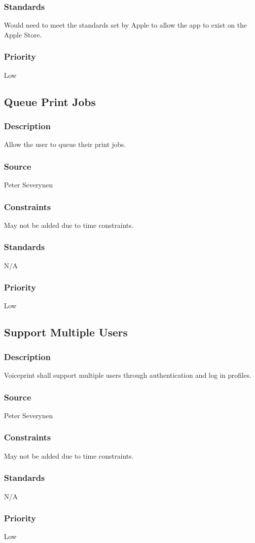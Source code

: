 \subsubsection{Standards}
Would need to meet the standards set by Apple to allow the app to exist on the Apple Store.
\subsubsection{Priority}
Low
\subsection{Queue Print Jobs}
\subsubsection{Description}
Allow the user to queue their print jobs.
\subsubsection{Source}
Peter Severynen
\subsubsection{Constraints}
May not be added due to time constraints.
\subsubsection{Standards}
N/A
\subsubsection{Priority}
Low
\subsection{Support Multiple Users}
\subsubsection{Description}
Voiceprint shall support multiple users through authentication and log in profiles.
\subsubsection{Source}
Peter Severynen
\subsubsection{Constraints}
May not be added due to time constraints.
\subsubsection{Standards}
N/A
\subsubsection{Priority}
Low